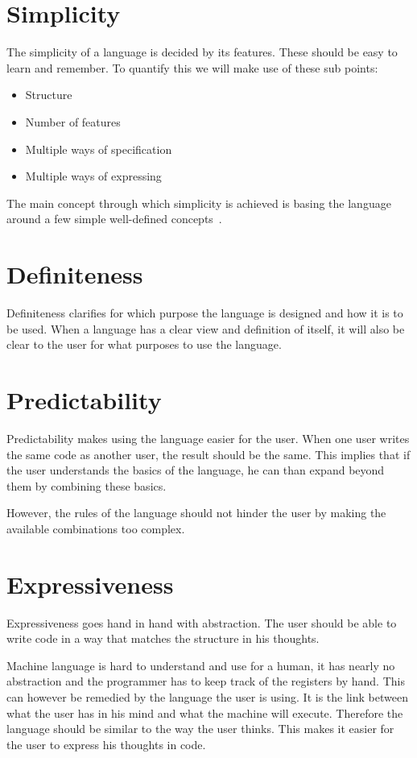 \section{Simplicity}
The simplicity of a language is decided by its features.
These should be easy to learn and remember.
To quantify this we will make use of these sub points:
\begin{itemize}[noitemsep]
   \item Structure
   \item Number of features
   \item Multiple ways of specification
   \item Multiple ways of expressing
\end{itemize}

The main concept through which simplicity is achieved is basing the language around a few simple well-defined concepts~\cite{khedker1997makes}.

\section{Definiteness}
Definiteness clarifies for which purpose the language is designed and how it is to be used.
When a language has a clear view and definition of itself, it will also be clear to the user for what purposes to use the language.

\section{Predictability}
Predictability makes using the language easier for the user.
When one user writes the same code as another user, the result should be the same.
This implies that if the user understands the basics of the language, he can than expand beyond them by combining these basics.

However, the rules of the language should not hinder the user by making the available combinations too complex.

\section{Expressiveness}
Expressiveness goes hand in hand with abstraction.
The user should be able to write code in a way that matches the structure in his thoughts.

Machine language is hard to understand and use for a human, it has nearly no abstraction and the programmer has to keep track of the registers by hand.
This can however be remedied by the language the user is using.
It is the link between what the user has in his mind and what the machine will execute.
Therefore the language should be similar to the way the user thinks.
This makes it easier for the user to express his thoughts in code.

